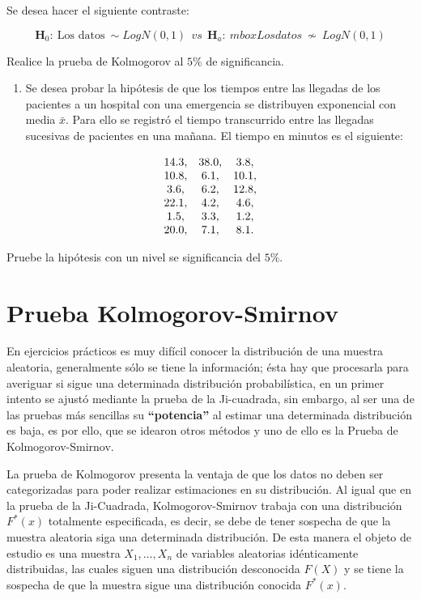 \documentclass[
  a4paper,
  oneside,
  openany]{book}
\providecommand{\tightlist}{%
  \setlength{\itemsep}{0pt}\setlength{\parskip}{0pt}}
\begin{document}
Se desea hacer el siguiente contraste:

\[\textbf{H}_0: \ \mbox{Los datos} \ \sim LogN(0,1) \ \ vs \ \ \textbf{H}_a: \ mbox{Los datos} \  \nsim \ LogN(0,1)\]

Realice la prueba de Kolmogorov al \(5\%\) de significancia.

\begin{enumerate}
\def\labelenumi{\arabic{enumi}.}
\setcounter{enumi}{1}
\tightlist
\item
  Se desea probar la hipótesis de que los tiempos entre las llegadas de los pacientes a un hospital con una emergencia se distribuyen exponencial con media \(\bar{x}\). Para ello se registró el tiempo transcurrido entre las llegadas sucesivas de pacientes en una mañana. El tiempo en minutos es el siguiente:
\end{enumerate}

\[
\begin{array}{c c c}
14.3, & 38.0, & 3.8,  \\ 
10.8, & 6.1,& 10.1, \\ 
3.6, & 6.2, & 12.8, \\ 
22.1, & 4.2, & 4.6,  \\ 
1.5, & 3.3, & 1.2,  \\   
20.0, & 7.1,& 8.1.\\
\end{array}
\]

Pruebe la hipótesis con un nivel se significancia del \(5\%\).

\hypertarget{prueba-kolmogorov-smirnov}{%
\chapter{Prueba Kolmogorov-Smirnov}\label{prueba-kolmogorov-smirnov}}

En ejercicios prácticos es muy difícil conocer la distribución de una muestra aleatoria, generalmente
sólo se tiene la información; ésta hay que procesarla para averiguar si sigue una determinada distribución probabilística, en un primer intento se ajustó mediante la prueba de la Ji-cuadrada, sin embargo, al ser una de las pruebas más sencillas su \textbf{``potencia''} al estimar una determinada distribución es baja, es por ello, que se idearon otros métodos y uno de ello es la Prueba de Kolmogorov-Smirnov.

La prueba de Kolmogorov presenta la ventaja de que los datos no deben ser categorizadas para poder realizar estimaciones en su distribución. Al igual que en la prueba de la Ji-Cuadrada, Kolmogorov-Smirnov trabaja con una distribución \(F^*(x)\) totalmente especificada, es decir, se debe de tener sospecha de que la muestra aleatoria siga una determinada distribución. De esta manera el objeto de estudio es una muestra \(X_{1},\ldots,X_{n}\) de variables aleatorias idénticamente distribuidas, las cuales siguen una distribución desconocida \(F(X)\) y se tiene la sospecha de que la muestra sigue una distribución conocida \(F^*(x)\).
\end{document}
